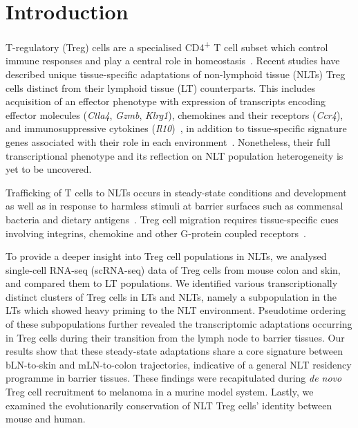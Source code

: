 
\section{Introduction}
\label{section2.1}
T-regulatory (Treg) cells are a specialised CD4\textsuperscript{+} T cell subset which control immune responses and play a central role in homeostasis~\citep{Sakaguchi2004-kz,Izcue2009-sq}. Recent studies have described unique tissue-specific adaptations of non-lymphoid tissue (NLTs) Treg cells distinct from their lymphoid tissue (LT) counterparts. This includes acquisition of an effector phenotype with expression of transcripts encoding effector molecules (\textit{Ctla4}, \textit{Gzmb}, \textit{Klrg1}), chemokines and their receptors (\textit{Ccr4}), and immunosuppressive cytokines (\textit{Il10})~\citep{Panduro2016-fz,Bollrath2013-fa}, in addition to tissue-specific signature genes associated with their role in each environment~\citep{liston_homeostatic_2014}. Nonetheless, their full transcriptional phenotype and its reflection on NLT population heterogeneity is yet to be uncovered.

Trafficking of T cells to NLTs occurs in steady-state conditions and development~\citep{Kimpton1995-ei,Thome2015-vg} as well as in response to harmless stimuli at barrier surfaces such as commensal bacteria and dietary antigens~\citep{Ivanov2008-uz}. Treg cell migration requires tissue-specific cues involving integrins, chemokine and other G-protein coupled receptors~\citep{Cepek1994-sj,Kim2013-pu,Chow2015-tc}.

To provide a deeper insight into Treg cell populations in NLTs, we analysed single-cell RNA-seq (scRNA-seq) data of Treg cells from mouse colon and skin, and compared them to LT populations. We identified various transcriptionally distinct clusters of Treg cells in LTs and NLTs, namely a subpopulation in the LTs which showed heavy priming to the NLT environment. Pseudotime ordering of these subpopulations further revealed the transcriptomic adaptations occurring in Treg cells during their transition from the lymph node to barrier tissues. Our results show that these steady-state adaptations share a core signature between bLN-to-skin and mLN-to-colon trajectories, indicative of a general NLT residency programme in barrier tissues. These findings were recapitulated during \textit{de novo} Treg cell recruitment to melanoma in a murine model system. Lastly, we examined the evolutionarily conservation of NLT Treg cells’ identity between mouse and human.


